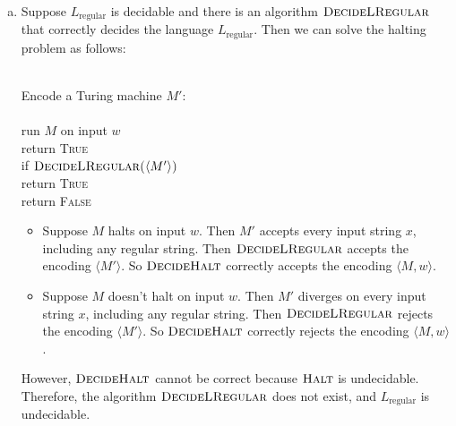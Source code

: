 \documentclass[11pt]{article}
\begin{document}



\begin{solution}
\begin{enumerate}[(a)]
\item Suppose $L_{\text{regular}}$ is decidable and there is an algorithm $\textsc{DecideLRegular}$ that correctly decides the language $L_{\text{regular}}$. Then we can solve the halting problem as follows:
\begin{algo}
	\+
\\	Encode a Turing machine $M'$:\+
\\	\+
\\	run $M$ on input $w$
\\	return \textsc{True}\-\-
\\	if $\textsc{DecideLRegular($\langle M' \rangle$)}$\+
\\	return \textsc{True}\-
\\	return \textsc{False}\-
\end{algo}
\begin{itemize}
\item Suppose $M$ halts on input $w$. Then $M'$ accepts every input string $x$, including any regular string. Then $\textsc{DecideLRegular}$ accepts the encoding $\langle M' \rangle$. So $\textsc{DecideHalt}$ correctly accepts the encoding $\langle M,w \rangle$.
\item Suppose $M$ doesn't halt on input $w$. Then $M'$ diverges on every input string $x$, including any regular string. Then $\textsc{DecideLRegular}$ rejects the encoding $\langle M' \rangle$. So $\textsc{DecideHalt}$ correctly rejects the encoding $\langle M,w \rangle$.
\end{itemize}
However, $\textsc{DecideHalt}$ cannot be correct because $\textsc{Halt}$ is undecidable. Therefore, the algorithm $\textsc{DecideLRegular}$ does not exist, and $L_{\text{regular}}$ is undecidable.


\end{enumerate}
\end{solution}
\end{document}
